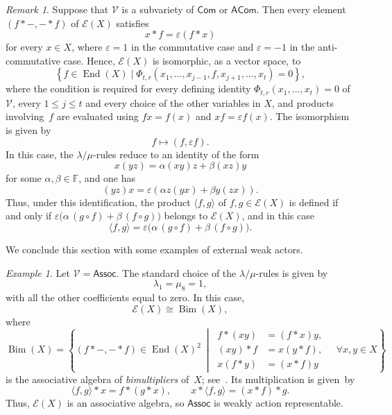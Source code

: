 \documentclass[reqno,a4paper]{amsart}
\theoremstyle{plain}
\theoremstyle{definition}
\theoremstyle{remark}
\newtheorem{remark}[subsection]{Remark}
\newtheorem{example}[subsection]{Example}
\numberwithin{equation}{section}
\newcommand{\F}{\mathbb{F}}
\newcommand{\E}{\mathcal{E}}
\newcommand{\V}{\mathcal{V}}
\DeclareMathOperator{\Bim}{Bim}
\DeclareMathOperator{\End}{End}
\newcommand{\Assoc}{\ensuremath{\mathsf{Assoc}}}
\newcommand{\Com}{\ensuremath{\mathsf{Com}}}
\newcommand{\ACom}{\ensuremath{\mathsf{ACom}}}
\begin{document}
\begin{remark}\label{RemarkExternalComACom}
Suppose that $\V$ is a subvariety of $\Com$ or $\ACom$. Then every element $(f\ast-,-\ast f)$ of $\E(X)$ satisfies
\[
x\ast f=\varepsilon(f\ast x)
\]
for every $x\in X$, where $\varepsilon=1$ in the commutative case and $\varepsilon=-1$ in the anti-commutative case. Hence, $\E(X)$ is isomorphic, as a vector space, to
\[
\left\{
f\in\End(X)
\mid
\Phi_{t,r}(x_1,\ldots,x_{j-1},f,x_{j+1},\ldots,x_t)=0
\right\},
\]
where the condition is required for every defining identity
$\Phi_{t,r}(x_1,\ldots,x_t)=0$ of~$\V$, every $1\leq j\leq t$ and every choice of the other variables in $X$, and products involving~$f$ are evaluated using $fx=f(x)$ and $xf=\varepsilon f(x)$. The isomorphism is given by
\[
f\longmapsto(f,\varepsilon f).
\]
In this case, the $\lambda/\mu$-rules reduce to an identity of the form
\[
x(yz)=\alpha(xy)z+\beta(xz)y
\]
for some $\alpha,\beta\in\F$, and one has
\[
(yz)x=\varepsilon (\alpha z(yx)+ \beta y(zx)).
\]
Thus, under this identification, the product $\langle f,g\rangle$ of $f,g\in\E(X)$ is defined if and only if $\varepsilon\bigl(\alpha\,(g\circ f)+\beta\,(f\circ g)\bigr)$ belongs to $\E(X)$, and in this case
\[
\langle f,g\rangle=\varepsilon\bigl(\alpha\,(g\circ f)+\beta\,(f\circ g)\bigr).
\]
\end{remark}

We conclude this section with some examples of external weak actors.

\begin{example}\label{ExampleExternalAssoc}
Let $\V=\Assoc$. The standard choice of the $\lambda/\mu$-rules is given by
\[
\lambda_1=\mu_8=1,
\]
with all the other coefficients equal to zero. In this case,
\[
\E(X)\cong\Bim(X),
\]
where
\[
\Bim(X)=
\left\{
(f\ast-,-\ast f)\in\End(X)^2
\ \middle|\
\begin{aligned}
f\ast(xy)&=(f\ast x)y,\\
(xy)\ast f&=x(y\ast f),\\
x(f\ast y)&=(x\ast f)y
\end{aligned} \quad \forall x,y\in X
\right\}
\]
is the associative algebra of \emph{bimultipliers} of~$X$; see~\cite{MacLane58}. Its multiplication is given~by
\[
\langle f,g\rangle\ast x=f\ast(g\ast x),
\qquad
x\ast\langle f,g\rangle=(x\ast f)\ast g.
\]
Thus, $\E(X)$ is an associative algebra, so $\Assoc$ is weakly action representable.
\end{example}
\end{document}
